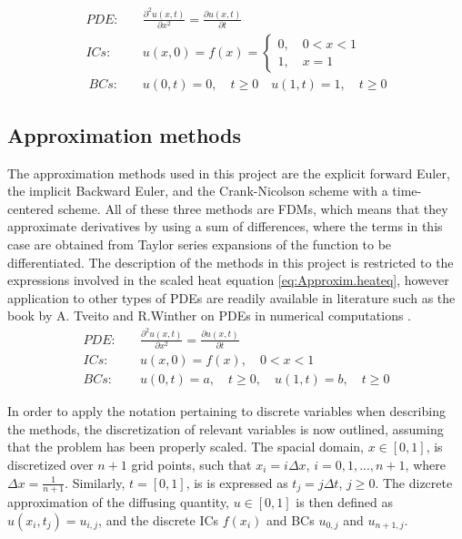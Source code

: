 \documentclass[%
oneside,                 %
final,                   %
10pt]{article}
\begin{document}
\begin{align}
PDE:&\quad \frac{\partial^2 u(x,t)}{\partial x^2}=\frac{\partial u(x,t)}{\partial t} \label{eq:scaled.rod}\\
ICs:&\quad u(x,0)=f(x)=  \begin{cases}
  0, \quad 0 < x < 1\\
 1, \quad x=1
  \end{cases} \label{eq:scaled.rodIC}\\\
BCs:& \quad u(0,t)=0, \quad t \geq 0 \quad u(1,t)=1, \quad t \geq 0 \label{eq:scaled.rodBC}
\end{align}

\subsection{Approximation methods}
\label{M.ApproxMethods}
The approximation methods used in this project are the explicit forward Euler, the implicit Backward Euler, and the Crank-Nicolson scheme with a time-centered scheme. All of these three methods are FDMs, which means that they approximate derivatives  by using a sum of differences, where the terms in this case are obtained from Taylor series expansions of the function to be differentiated. The description of the methods in this project is restricted to the expressions involved in the scaled heat equation \eqref{eq:Approxim.heateq}, however application to other types of PDEs are readily available in literature such as the book by A. Tveito and R.Winther on PDEs in numerical computations \cite{compPDE}.
\begin{align}
PDE:& \quad \frac{\partial^2 u(x,t)}{\partial x^2}=\frac{\partial u(x,t)}{\partial t} \label{eq:Approxim.heateq}\\
ICs:& \quad u(x,0)=f(x), \quad 0< x < 1 \label{eq:Approxim.IC}\\
BCs:& \quad u(0,t)=a, \quad t \geq 0, \quad u(1,t)=b, \quad t \geq 0  \label{eq:Approxim.BC}
\end{align}

In order to apply the notation pertaining to discrete variables when describing the methods, the discretization of relevant variables is now outlined, assuming that the problem has been properly scaled. The spacial domain, $x \in [0,1]$, is discretized over $n+1$ grid points, such that $x_i=i \Delta x$, $i=0,1,...,n+1$, where $\Delta x= \frac{1}{n+1}$. Similarly, $t=[0,1]$, is is expressed as $t_j=j \Delta t$, $j\geq 0$. The dizcrete approximation of the diffusing quantity, $u \in [0,1]$ is then defined as $u(x_i,t_j)=u_{i,j}$, and the discrete ICs $f(x_i)$ and BCs $u_{0,j}$ and $u_{n+1,j}$. 
\end{document}
